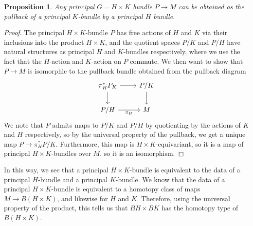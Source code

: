 \documentclass[psamsfonts, 12pt]{amsart}
\newtheorem{prop}[thm]{Proposition}
\theoremstyle{definition}
\theoremstyle{remark}
\begin{document}
\fi
%
\begin{prop}
Any principal $G = H \times K$ bundle $P \to M$ can be obtained as the pullback
of a principal $K$-bundle by a principal $H$ bundle.
\end{prop}
%
\begin{proof}
The principal $H\times K$-bundle $P$ has free actions of $H$ and $K$ via their
inclusions into the product $H \times K$, and the quotient spaces $P/K$ and $P/H$
have natural structures as principal $H$ and $K$-bundles respectively, where
we use the fact that the $H$-action and $K$-action on $P$ commute. We then want
to show that $P \to M$ is isomorphic to the pullback bundle obtained from
the pullback diagram
\[\begin{tikzcd}
\pi_H^*P_K \ar[r]\ar[d] & P/K \ar[d] \\
P/H \ar[r, "\pi_H"'] & M
\end{tikzcd}\]
We note that $P$ admits maps to $P/K$ and $P/H$ by quotienting by the actions
of $K$ and $H$ respectively, so by the universal property of the pullback, we get a
unique map $P \to \pi_H^*P/K$. Furthermore, this map is $H\times K$-equivariant, so
it is a map of principal $H\times K$-bundles over $M$, so it is an isomorphism.
\end{proof}
%
In this way, we see that a principal $H\times K$-bundle is equivalent to
the data of a principal $H$-bundle and a principal $K$-bundle. We know that
the data of a principal $H\times K$-bundle is equivalent to a homotopy class
of maps $M \to B(H\times K)$, and likewise for $H$ and $K$. Therefore, using the
universal property of the product, this tells us that $BH \times BK$ has the homotopy
type of $B(H \times K)$. \\
\end{document}
